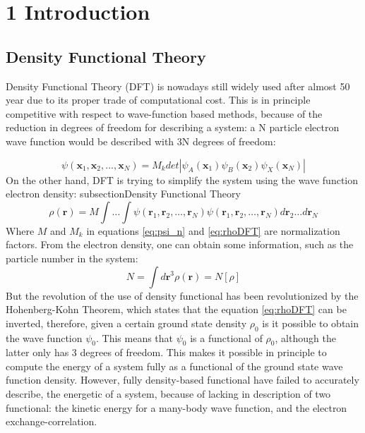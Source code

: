 \section{1	Introduction}
	\label{1intro}

\subsection{Density Functional Theory}

Density Functional Theory (DFT) is nowadays still widely used after almost 50 year due to its proper trade of computational cost. This is in principle competitive with respect to wave-function based methods, because of the reduction in degrees of freedom for describing a system: a N particle electron wave function would be described with 3N degrees of freedom:

\begin{equation}
\psi(\mathbf{x}_1,\mathbf{x}_2,...,\mathbf{x}_N) = M_k det 
\left |
\psi_A(\mathbf{x}_1) \psi_B(\mathbf{x}_2) \psi_X(\mathbf{x}_N)
\right |
\label{eq:psi_n}
\end{equation}
On the other hand, DFT is trying to simplify the system using the wave function electron density:
subsection{Density Functional Theory}
\begin{equation}
\rho(\mathbf{r}) = M \int \ldots \int \psi(\mathbf{r}_1,\mathbf{r}_2,\ldots,\mathbf{r}_N) \psi(\mathbf{r}_1,\mathbf{r}_2,\ldots,\mathbf{r}_N) d\mathbf{r}_2 \ldots d\mathbf{r}_N
\label{eq:rhoDFT}
\end{equation}
Where $M$ and $M_k$ in equations \ref{eq:psi_n} and \ref{eq:rhoDFT} are normalization factors. From the electron density, one can obtain some information, such as the particle number in the system:
\begin{equation}
N = \int d\mathbf{r}^3 \rho(\mathbf{r}) = N[\rho]
\label{eq:Nparticles}
\end{equation}
But the revolution of the use of density functional has been revolutionized by the Hohenberg-Kohn Theorem, which states that the equation \ref{eq:rhoDFT} can be inverted, therefore, given a certain ground state density $\rho_0$ is it possible to obtain the wave function $\psi_0$. This means that $\psi_0$ is a functional of $\rho_0$, although the latter only has 3 degrees of freedom. This makes it possible in principle to compute the energy of a system fully as a functional of the ground state wave function density. However, fully density-based functional have failed to accurately describe, the energetic of a system, because of lacking in description of two functional: the kinetic energy for a many-body wave function, and the electron exchange-correlation.

